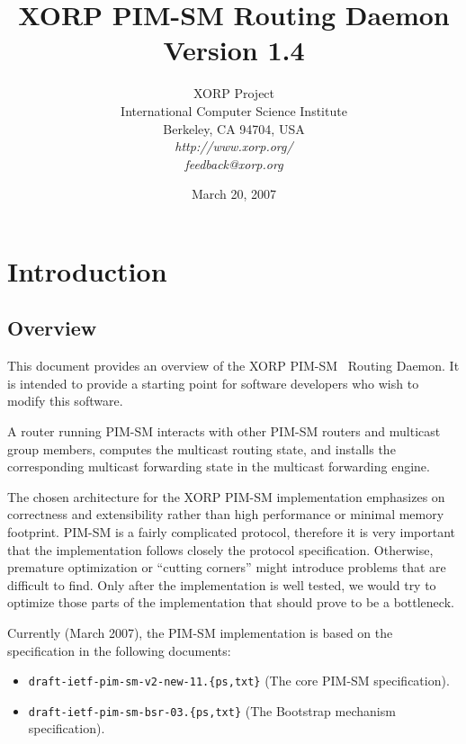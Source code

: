 \documentclass[11pt]{article}
\begin{document}
\title{XORP PIM-SM Routing Daemon \\
\vspace{1ex}
Version 1.4}
\author{ XORP Project					\\
	 International Computer Science Institute	\\
	 Berkeley, CA 94704, USA			\\
         {\it http://www.xorp.org/}			\\
	 {\it feedback@xorp.org}
}
\date{March 20, 2007}

\maketitle


\section{Introduction}


\subsection{Overview}

This document provides an overview of the XORP PIM-SM~\cite{PIM-SM}
Routing Daemon. It is intended to provide a starting point for software
developers who wish to modify this software.

A router running PIM-SM interacts with other PIM-SM routers and
multicast group members, computes the multicast routing state, and installs
the corresponding multicast forwarding state in the multicast forwarding
engine.

The chosen architecture for the XORP PIM-SM implementation emphasizes on
correctness and extensibility rather than high performance or minimal
memory footprint. PIM-SM is a fairly complicated protocol, therefore it
is very important that the implementation follows closely the protocol
specification. Otherwise, premature optimization or ``cutting corners''
might introduce problems that are difficult to find. Only after the
implementation is well tested, we would
try to optimize those parts of the implementation that should prove
to be a bottleneck.

Currently (March 2007), the PIM-SM implementation is based
on the specification in the following documents:

\begin{itemize}
  \item \verb=draft-ietf-pim-sm-v2-new-11.{ps,txt}= (The core PIM-SM
  specification).
  \item \verb=draft-ietf-pim-sm-bsr-03.{ps,txt}= (The Bootstrap mechanism
  specification).
\end{itemize}
\end{document}
